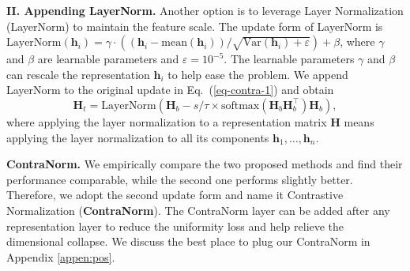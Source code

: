 \documentclass{article}
\def\vh{{\bm{h}}}
\def\mH{{\bm{H}}}
\newcommand{\softmax}{\mathrm{softmax}}
\theoremstyle{definition}
\theoremstyle{remark}
\theoremstyle{theorem}
\begin{document}
\textbf{II. Appending LayerNorm.} Another option is to leverage Layer Normalization (LayerNorm) \citep{ba2016layer} to maintain the feature scale. The update form of LayerNorm is $\text{LayerNorm}(\vh_i)=\gamma\cdot((\vh_i-\text{mean}(\vh_i))/\sqrt{\text{Var}(\vh_i)+\varepsilon})+\beta$, where $\gamma$ and $\beta$ are learnable parameters and $\varepsilon=10^{-5}$. The learnable parameters $\gamma$ and $\beta$ can rescale the representation $\vh_i$ to help ease the problem. We append LayerNorm to the original update in Eq.~(\ref{eq-contra-1}) and obtain
\begin{equation} \label{eq-contra-3}
    \mH_t = \mbox{LayerNorm}\left(\mH_b - s/\tau \times \softmax(\mH_b\mH_b^{\top})\mH_b\right),
\end{equation}
where applying the layer normalization to a representation matrix $\mH$ means applying the layer normalization to all its components $\vh_1,\dots,\vh_n$. 

\textbf{ContraNorm.} We empirically compare the two proposed methods and find their performance comparable, while the second one performs slightly better. Therefore, we adopt the second update form and name it Contrastive Normalization (\textbf{ContraNorm}). The ContraNorm layer can be added after any representation layer to reduce the uniformity loss and help relieve the dimensional collapse. We discuss the best place to plug our ContraNorm in Appendix \ref{appen:pos}. 
\end{document}
